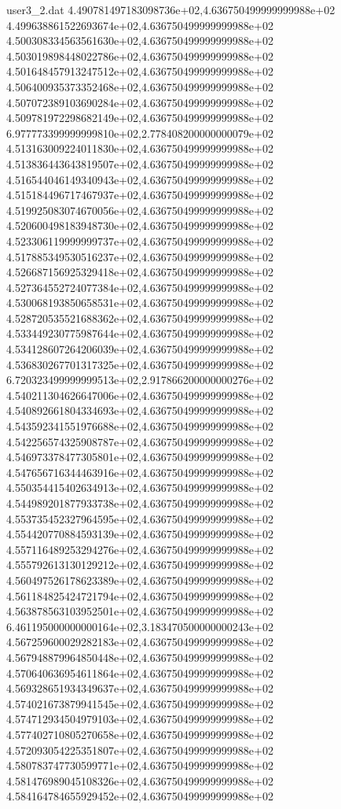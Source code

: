 \begin{filecontents}{user3_2.dat}
4.490781497183098736e+02,4.636750499999999988e+02
4.499638861522693674e+02,4.636750499999999988e+02
4.500308334563561630e+02,4.636750499999999988e+02
4.503019898448022786e+02,4.636750499999999988e+02
4.501648457913247512e+02,4.636750499999999988e+02
4.506400935373352468e+02,4.636750499999999988e+02
4.507072389103690284e+02,4.636750499999999988e+02
4.509781972298682149e+02,4.636750499999999988e+02
6.977773399999999810e+02,2.778408200000000079e+02
4.513163009224011830e+02,4.636750499999999988e+02
4.513836443643819507e+02,4.636750499999999988e+02
4.516544046149340943e+02,4.636750499999999988e+02
4.515184496717467937e+02,4.636750499999999988e+02
4.519925083074670056e+02,4.636750499999999988e+02
4.520600498183948730e+02,4.636750499999999988e+02
4.523306119999999737e+02,4.636750499999999988e+02
4.517885349530516237e+02,4.636750499999999988e+02
4.526687156925329418e+02,4.636750499999999988e+02
4.527364552724077384e+02,4.636750499999999988e+02
4.530068193850658531e+02,4.636750499999999988e+02
4.528720535521688362e+02,4.636750499999999988e+02
4.533449230775987644e+02,4.636750499999999988e+02
4.534128607264206039e+02,4.636750499999999988e+02
4.536830267701317325e+02,4.636750499999999988e+02
6.720323499999999513e+02,2.917866200000000276e+02
4.540211304626647006e+02,4.636750499999999988e+02
4.540892661804334693e+02,4.636750499999999988e+02
4.543592341551976688e+02,4.636750499999999988e+02
4.542256574325908787e+02,4.636750499999999988e+02
4.546973378477305801e+02,4.636750499999999988e+02
4.547656716344463916e+02,4.636750499999999988e+02
4.550354415402634913e+02,4.636750499999999988e+02
4.544989201877933738e+02,4.636750499999999988e+02
4.553735452327964595e+02,4.636750499999999988e+02
4.554420770884593139e+02,4.636750499999999988e+02
4.557116489253294276e+02,4.636750499999999988e+02
4.555792613130129212e+02,4.636750499999999988e+02
4.560497526178623389e+02,4.636750499999999988e+02
4.561184825424721794e+02,4.636750499999999988e+02
4.563878563103952501e+02,4.636750499999999988e+02
6.461195000000000164e+02,3.183470500000000243e+02
4.567259600029282183e+02,4.636750499999999988e+02
4.567948879964850448e+02,4.636750499999999988e+02
4.570640636954611864e+02,4.636750499999999988e+02
4.569328651934349637e+02,4.636750499999999988e+02
4.574021673879941545e+02,4.636750499999999988e+02
4.574712934504979103e+02,4.636750499999999988e+02
4.577402710805270658e+02,4.636750499999999988e+02
4.572093054225351807e+02,4.636750499999999988e+02
4.580783747730599771e+02,4.636750499999999988e+02
4.581476989045108326e+02,4.636750499999999988e+02
4.584164784655929452e+02,4.636750499999999988e+02

\end{filecontents}
